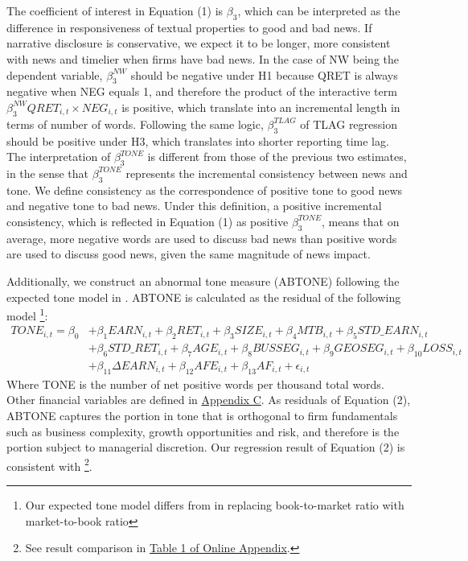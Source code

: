 \documentclass[a4paper]{article}
\begin{document}
\begin{spacing}{2}
The coefficient of interest in Equation (1) is $\beta_3$, which can be interpreted as the difference in responsiveness of textual properties to good and bad news. If narrative disclosure is conservative, we expect it to be longer, more consistent with news and timelier when firms have bad news. In the case of NW being the dependent variable, $\beta_3^{NW}$ should be negative under H1 because QRET is always negative when NEG equals 1, and therefore the product of the interactive term $\beta_3^{NW}QRET_{i,t}\times NEG_{i,t}$ is positive, which translate into an incremental length in terms of number of words. Following the same logic, $\beta_3^{TLAG}$ of TLAG regression should be positive under H3, which translates into shorter reporting time lag. The interpretation of $\beta_3^{TONE}$ is different from those of the previous two estimates, in the sense that $\beta_3^{TONE}$ represents the incremental consistency between news and tone. We define consistency as the correspondence of positive tone to good news and negative tone to bad news. Under this definition, a positive incremental consistency, which is reflected in Equation (1) as positive $\beta_3^{TONE}$, means that on average, more negative words are used to discuss bad news than positive words are used to discuss good news, given the same magnitude of news impact.

Additionally, we construct an abnormal tone measure (ABTONE) following the expected tone model in \cite{huangToneManagement2014}. ABTONE is calculated as the residual of the following model \footnote{Our expected tone model differs from \cite{huangToneManagement2014} in replacing book-to-market ratio with market-to-book ratio}:
\begin{equation} \label{eq2}
\begin{split}
TONE_{i,t}=\beta_0&+\beta_1EARN_{i,t}+\beta_2RET_{i,t}+\beta_3SIZE_{i,t}+\beta_4MTB_{i,t}+\beta_5STD\_EARN_{i,t}\\
&+\beta_6STD\_RET_{i,t}+\beta_7AGE_{i,t}+\beta_8BUSSEG_{i,t}+\beta_9GEOSEG_{i,t}+\beta_{10}LOSS_{i,t}\\
&+\beta_{11}\Delta EARN_{i,t}+\beta_{12}AFE_{i,t}+\beta_{13}AF_{i,t}+\epsilon_{i,t}
\end{split}
\end{equation}
Where TONE is the number of net positive words per thousand total words. Other financial variables are defined in \hyperref[appc]{Appendix C}. As residuals of Equation (2), ABTONE captures the portion in tone that is orthogonal to firm fundamentals such as business complexity, growth opportunities and risk, and therefore is the portion subject to managerial discretion. Our regression result of Equation (2) is consistent with \cite{huangToneManagement2014} \footnote{See result comparison in \hyperref[oat1]{Table 1 of Online Appendix}.}.


\end{spacing}
\end{document}
